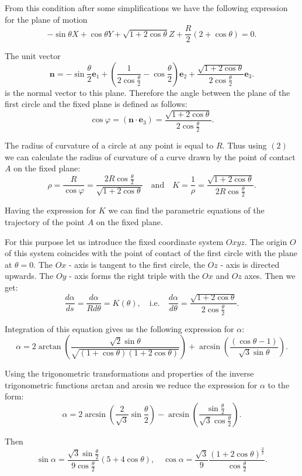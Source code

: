 \documentclass[10pt]{enoc2011}
\renewcommand{\vec}[1]{\boldsymbol{#1}}
\begin{document}
From this condition after some simplifications we have the following expression for the plane of motion
$$
-\sin\theta X+\cos\theta Y+\sqrt{1+2\cos\theta}Z+\frac{R}{2}\left(2+\cos\theta\right)=0.
$$

The unit vector
$$
\vec n =-\sin\frac{\theta}{2}\vec e_1+\left(\frac{1}{2\cos\frac{\theta}{2}}-\cos\frac{\theta}{2}\right)\vec e_2+\frac{\sqrt{1+2\cos\theta}}{2\cos\frac{\theta}{2}}\vec e_3.
$$
is the normal vector to this plane. Therefore the angle between the plane of the first circle and the fixed plane is defined as follows:
$$
\cos\varphi=\left(\vec n\cdot\vec e_3\right)=\frac{\sqrt{1+2\cos\theta}}{2\cos\frac{\theta}{2}}.
$$

The radius of curvature of a circle at any point is equal to $R$. Thus using $(2)$ we can calculate the radius of curvature of a curve drawn by the point of contact $A$ on the fixed plane:
$$
\rho=\frac{R}{\cos\varphi}=\frac{2R\cos\frac{\theta}{2}}{\sqrt{1+2\cos\theta}}\quad\mbox{and}\quad
K=\frac{1}{\rho}=\frac{\sqrt{1+2\cos\theta}}{2R\cos\frac{\theta}{2}}.
$$

Having the expression for $K$ we can find the parametric equations of the trajectory of the point $A$ on the fixed plane.

For this purpose let us introduce the fixed coordinate system $Oxyz$. The origin $O$ of this system coincides with the point of contact of the first circle with the plane at $\theta=0$. The $Ox$ - axis is tangent to the first circle, the $Oz$ - axis is directed upwards. The $Oy$ - axis forms the right triple with the $Ox$ and $Oz$ axes. Then we get:
$$
\frac{d\alpha}{ds}=\frac{d\alpha}{Rd\theta}=K\left(\theta\right),\quad\mbox{i.e.}\quad \frac{d\alpha}{d\theta}=\frac{\sqrt{1+2\cos\theta}}{2\cos\frac{\theta}{2}}.
$$

Integration of this equation gives us the following expression for $\alpha$:
$$
\alpha=2\arctan\left(\frac{\sqrt{2}\sin\theta}{\sqrt{\left(1+\cos\theta\right)\left(1+2\cos\theta\right)}}\right)+
\arcsin\left(\frac{\left(\cos\theta-1\right)}{\sqrt{3}\sin\theta}\right).
$$

Using the trigonometric transformations and properties of the inverse trigonometric functions arctan and arcsin we reduce the expression for $\alpha$ to the form:
$$
\alpha=2\arcsin\left(\frac{2}{\sqrt{3}}\sin\frac{\theta}{2}\right)-\arcsin\left(\frac{\sin\frac{\theta}{2}}
{\sqrt{3}\cos\frac{\theta}{2}}\right).
$$

Then
$$
\sin\alpha=\frac{\sqrt{3}\sin\frac{\theta}{2}}{9\cos\frac{\theta}{2}}\left(5+4\cos\theta\right),\quad
\cos\alpha=\frac{\sqrt{3}}{9}\frac{\left(1+2\cos\theta\right)^{\frac{3}{2}}}
{\cos\frac{\theta}{2}}.
$$
\end{document}
